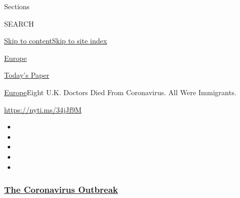 Sections

SEARCH

\protect\hyperlink{site-content}{Skip to
content}\protect\hyperlink{site-index}{Skip to site index}

\href{https://www.nytimes3xbfgragh.onion/section/world/europe}{Europe}

\href{https://myaccount.nytimes3xbfgragh.onion/auth/login?response_type=cookie\&client_id=vi}{}

\href{https://www.nytimes3xbfgragh.onion/section/todayspaper}{Today's
Paper}

\href{/section/world/europe}{Europe}\textbar{}Eight U.K. Doctors Died
From Coronavirus. All Were Immigrants.

\url{https://nyti.ms/34jJf9M}

\begin{itemize}
\item
\item
\item
\item
\item
\end{itemize}

\hypertarget{the-coronavirus-outbreak}{%
\subsubsection{\texorpdfstring{\href{https://www.nytimes3xbfgragh.onion/news-event/coronavirus?name=styln-coronavirus-national\&region=TOP_BANNER\&variant=undefined\&block=storyline_menu_recirc\&action=click\&pgtype=Article\&impression_id=4ad93cf0-e393-11ea-918c-0f8207e68c04}{The
Coronavirus
Outbreak}}{The Coronavirus Outbreak}}\label{the-coronavirus-outbreak}}

